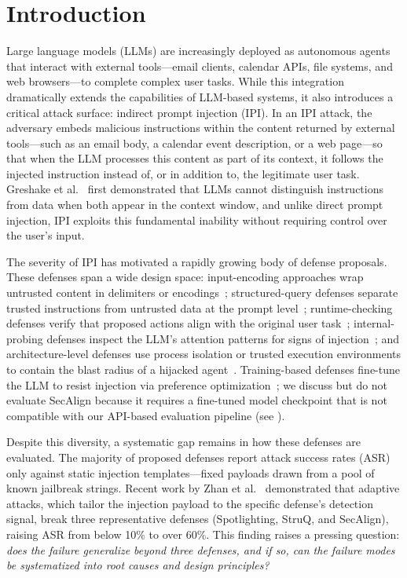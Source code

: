 \section{Introduction}
\label{sec:intro}

Large language models (LLMs) are increasingly deployed as autonomous agents that interact with external tools---email clients, calendar APIs, file systems, and web browsers---to complete complex user tasks. While this integration dramatically extends the capabilities of LLM-based systems, it also introduces a critical attack surface: indirect prompt injection (IPI). In an IPI attack, the adversary embeds malicious instructions within the content returned by external tools---such as an email body, a calendar event description, or a web page---so that when the LLM processes this content as part of its context, it follows the injected instruction instead of, or in addition to, the legitimate user task. Greshake et al.~\cite{greshake2023not} first demonstrated that LLMs cannot distinguish instructions from data when both appear in the context window, and unlike direct prompt injection, IPI exploits this fundamental inability without requiring control over the user's input.

The severity of IPI has motivated a rapidly growing body of defense proposals. These defenses span a wide design space: input-encoding approaches wrap untrusted content in delimiters or encodings~\cite{hines2024defending}; structured-query defenses separate trusted instructions from untrusted data at the prompt level~\cite{chen2024struq}; runtime-checking defenses verify that proposed actions align with the original user task~\cite{jia2025task}; internal-probing defenses inspect the LLM's attention patterns for signs of injection~\cite{hung2025attention}; and architecture-level defenses use process isolation or trusted execution environments to contain the blast radius of a hijacked agent~\cite{wu2025isolategpt,li2025security}. Training-based defenses fine-tune the LLM to resist injection via preference optimization~\cite{chen2024secalign}; we discuss but do not evaluate SecAlign because it requires a fine-tuned model checkpoint that is not compatible with our API-based evaluation pipeline (see ).

Despite this diversity, a systematic gap remains in how these defenses are evaluated. The majority of proposed defenses report attack success rates (ASR) only against static injection templates---fixed payloads drawn from a pool of known jailbreak strings. Recent work by Zhan et al.~\cite{zhan2025adaptive} demonstrated that adaptive attacks, which tailor the injection payload to the specific defense's detection signal, break three representative defenses (Spotlighting, StruQ, and SecAlign), raising ASR from below 10\% to over 60\%. This finding raises a pressing question: \emph{does the failure generalize beyond three defenses, and if so, can the failure modes be systematized into root causes and design principles?}

